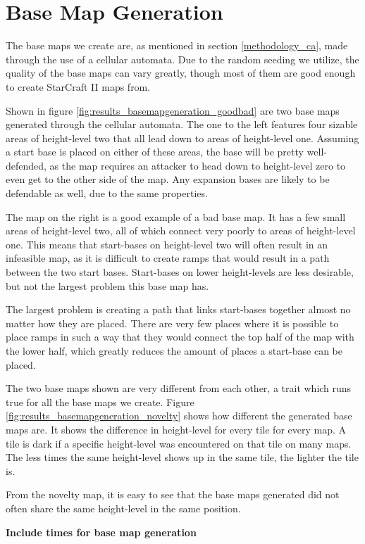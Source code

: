 \section{Base Map Generation}
\label{results_basemapgeneration}

The base maps we create are, as mentioned in section \ref{methodology_ca}, made through the use of a cellular automata. Due to the random seeding we utilize, the quality of the base maps can vary greatly, though most of them are good enough to create StarCraft II maps from.

Shown in figure \ref{fig:results_basemapgeneration_goodbad} are two base maps generated through the cellular automata. The one to the left features four sizable areas of height-level two that all lead down to areas of height-level one. Assuming a start base is placed on either of these areas, the base will be pretty well-defended, as the map requires an attacker to head down to height-level zero to even get to the other side of the map. Any expansion bases are likely to be defendable as well, due to the same properties.

The map on the right is a good example of a bad base map. It has a few small areas of height-level two, all of which connect very poorly to areas of height-level one. This means that start-bases on height-level two will often result in an infeasible map, as it is difficult to create ramps that would result in a path between the two start bases. Start-bases on lower height-levels are less desirable, but not the largest problem this base map has. 

The largest problem is creating a path that links start-bases together almost no matter how they are placed. There are very few places where it is possible to place ramps in such a way that they would connect the top half of the map with the lower half, which greatly reduces the amount of places a start-base can be placed.


The two base maps shown are very different from each other, a trait which runs true for all the base maps we create. Figure \ref{fig:results_basemapgeneration_novelty} shows how different the generated base maps are. It shows the difference in height-level for every tile for every map. A tile is dark if a specific height-level was encountered on that tile on many maps. The less times the same height-level shows up in the same tile, the lighter the tile is.


From the novelty map, it is easy to see that the base maps generated did not often share the same height-level in the same position.




\textbf{Include times for base map generation}